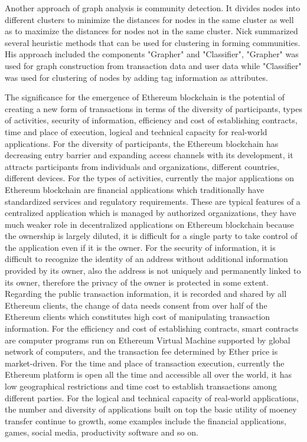 Another approach of graph analysis is community detection. It divides nodes into different clusters to minimize the distances for nodes in the same cluster as well as to maximize the distances for nodes not in the same cluster. Nick \cite{7} summarized several heuristic methods that can be used for clustering in forming communities. His approach included the components "Grapher" and "Classifier", "Grapher" was used for graph construction from transaction data and user data while "Classifier" was used for clustering of nodes by adding tag information as attributes. 


The significance for the emergence of Ethereum blockchain is the potential of creating a new form of transactions in terms of the diversity of participants, types of activities, security of information, efficiency and cost of establishing contracts, time and place of execution, logical and technical capacity for real-world applications. For the diversity of participants, the Ethereum blockchain has decreasing entry barrier and expanding access channels with its development, it attracts participants from individuals and organizations, different countries, different devices. For the types of activities, currently the major applications on Ethereum blockchain are financial applications which traditionally have standardized services and regulatory requirements. These are typical features of a centralized application which is managed by authorized organizations, they have much weaker role in decentralized applications on Ethereum blockchain because the ownership is largely diluted, it is difficult for a single party to take control of the application even if it is the owner. For the security of information, it is difficult to recognize the identity of an address without additional information provided by its owner, also the address is not uniquely and permanently linked to its owner, therefore the privacy of the owner is protected in some extent. Regarding the public transaction information, it is recorded and shared by all Ethereum clients, the change of data needs consent from over half of the Ethereum clients which constitutes high cost of manipulating transaction information. For the efficiency and cost of establishing contracts, smart contracts are computer programs run on Ethereum Virtual Machine supported by global network of computers, and the transaction fee determined by Ether price is market-driven. For the time and place of transaction execution, currently the Ethereum platform is open all the time and accessible all over the world, it has low geographical restrictions and time cost to establish transactions among different parties. For the logical and technical capacity of real-world applications, the number and diversity of applications built on top the basic utility of moeney transfer continue to growth, some examples include the financial applications, games, social media, productivity software and so on.

